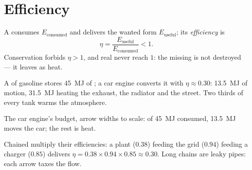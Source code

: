 \section{Efficiency}

\begin{definition}[Efficiency]\label{def:g10:energy-conservation:efficiency}
A  consumes $E_{\text{consumed}}$ and delivers the wanted
form $E_{\text{useful}}$; its \emph{efficiency} is
\[
\eta = \frac{E_{\text{useful}}}{E_{\text{consumed}}} < 1 .
\]
Conservation forbids $\eta > 1$, and real  never reach $1$:
the missing  is not destroyed --- it leaves as heat.
\end{definition}

\begin{example}\label{ex:g10:energy-conservation:engine}
A  of gasoline stores \qty{45}{MJ} of ; a
car engine converts it with $\eta \approx 0.30$: \qty{13.5}{MJ} of
motion, \qty{31.5}{MJ} heating the exhaust, the radiator and the
street. Two thirds of every tank warms the atmosphere.
\end{example}

\begin{omfigure}

{\small The car engine's budget, arrow widths to scale: of
\qty{45}{MJ} consumed, \qty{13.5}{MJ} moves the car; the rest is heat.}
\end{omfigure}

\begin{remark}\label{rem:g10:energy-conservation:chain-eta}
Chained  multiply their efficiencies: a  plant
($0.38$) feeding the grid ($0.94$) feeding a charger ($0.85$)
delivers $\eta = 0.38 \times 0.94 \times 0.85 \approx 0.30$. Long
chains are leaky pipes: each arrow taxes the flow.
\end{remark}

